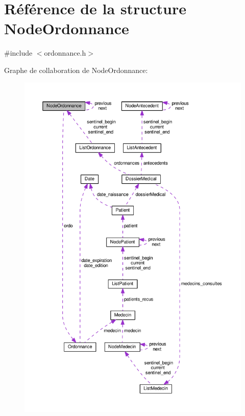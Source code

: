 \hypertarget{struct_node_ordonnance}{\section{Référence de la structure Node\-Ordonnance}
\label{struct_node_ordonnance}
}


{\ttfamily \#include $<$ordonnance.\-h$>$}



Graphe de collaboration de Node\-Ordonnance\-:
\nopagebreak
\begin{figure}[H]
\begin{center}
\leavevmode
\includegraphics[width=350pt]{struct_node_ordonnance__coll__graph}
\end{center}
\end{figure}

